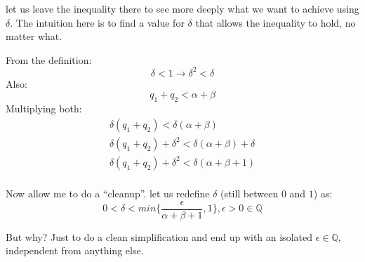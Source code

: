 \begin{bookproof}
let us leave the inequality there to see more deeply what we want to achieve using $\delta$. The intuition here is to find a value for $\delta$ that allows the inequality to hold, no matter what.

From the definition:
$$\delta < 1 \rightarrow \delta ^2 < \delta$$
Also:
$$q_1 + q_2 < \alpha + \beta$$
Multiplying both:
\begin{align*}
\delta (q_1 + q_2) < \delta (\alpha + \beta) \\
\delta (q_1 + q_2) + \delta ^2 < \delta (\alpha + \beta) + \delta \\
\delta (q_1 + q_2) + \delta ^2 < \delta (\alpha + \beta + 1) \\
\end{align*}

Now allow me to do a \textquotedblleft cleanup\textquotedblright. let us redefine $\delta$ (still between $0$ and $1$) as:
$$0 < \delta < min\{\frac{\epsilon}{\alpha + \beta + 1}, 1\}, \epsilon >0 \in \mathbb{Q}$$

But why? Just to do a clean simplification and end up with an isolated $\epsilon \in \mathbb{Q}$, independent from anything else.
\end{bookproof}

